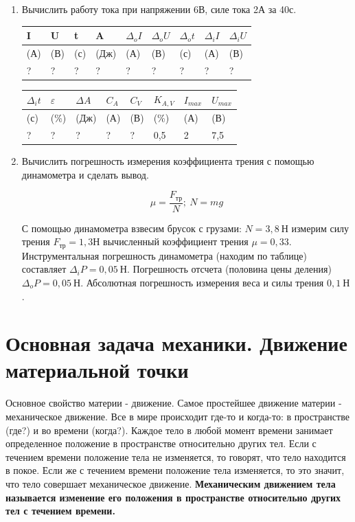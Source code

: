 \documentclass[a5paper, 10pt]{diss_4}
\renewcommand{\'}{\,'}
\begin{document}
\begin{enumerate}
\item{ Вычислить работу тока при напряжении 6В, силе тока 2А за 40с.\\

\begin{center}
\begin{tabular}[c]{l|l|l|l|l|l|l|l|l}
I & U & t & A & $\Delta_o I$ & $\Delta_o U$ & $\Delta_o t$ &
$\Delta_i I$ & $\Delta_i U$
\\ \hline
(А) & (В) & (с) & (Дж) & (А) & (В) & (с) & (А) & (В)
\\ \hline
? & ?  & ? & ? & ? & ?  & ?  & ? & ?
\end{tabular}


\begin{tabular}[c]{l|l|l|l|l|l|l|l}
$\Delta_i t$ & $\varepsilon$ & $\Delta A$
& ${C_A}$ & ${C_V}$ & ${K_{A,V}}$ & ${I_{max}}$ & ${U_{max}}$\\ \hline
(с) & (\%) & (Дж) & (А) & (В) & (\%) & (А) & (В) \\  \hline
? & ? & ? & ? & ? & 0,5 & 2 & 7,5
\end{tabular}
\end{center}
}

 \item{ Вычислить погрешность измерения коэффициента трения с помощью
динамометра и сделать вывод.

\[\mu=\frac{F_{тр}}{N}; \ N=mg\]

 С помощью динамометра взвесим брусок с грузами: $N = 3,8\ Н$ измерим силу трения
$F_{тр}=1,3 Н$ вычисленный коэффициент трения $\mu=0,33$. Инструментальная
погрешность динамометра (находим по таблице) составляет $\Delta_i P =0,05\ Н$.
Погрешность отсчета (половина цены деления) $\Delta_o P =0,05\ Н$. Абсолютная
погрешность измерения веса и силы трения $0,1\ Н$.

}
\end{enumerate}


\section{Основная задача механики. Движение материальной точки}

  Основное свойство материи - движение. Самое простейшее движение материи -
механическое движение. Все в мире происходит где-то и когда-то: в
пространстве (где?) и во времени (когда?). Каждое тело в любой момент времени
занимает определенное положение в пространстве относительно других тел. Если с
 течением времени положение тела не изменяется, то говорят, что тело находится
в покое. Если же с течением времени положение тела изменяется, то это значит,
что тело совершает механическое движение. \textbf{Механическим движением
тела называется изменение его положения в пространстве относительно других
тел с течением времени.}
\end{document}

